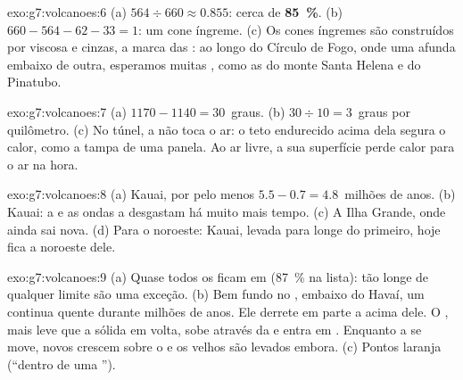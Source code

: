 \begin{solution}{exo:g7:volcanoes:6}
(a) $564 \div 660 \approx 0.855$: cerca de \textbf{85~\%}. (b)
$660 - 564 - 62 - 33 = 1$: um cone íngreme. (c) Os cones íngremes são
construídos por  viscosa e cinzas, a marca das : ao
longo do Círculo de Fogo, onde uma  afunda embaixo de outra,
esperamos muitas , como as do monte Santa Helena e do
Pinatubo.
\end{solution}

\begin{solution}{exo:g7:volcanoes:7}
(a) $1170 - 1140 = 30$~graus. (b) $30 \div 10 = 3$~graus por quilômetro.
(c) No túnel, a  não toca o ar: o teto endurecido acima dela segura o
calor, como a tampa de uma panela. Ao ar livre, a sua superfície perde
calor para o ar na hora.
\end{solution}

\begin{solution}{exo:g7:volcanoes:8}
(a) Kauai, por pelo menos $5.5 - 0.7 = 4.8$~milhões de anos. (b) Kauai: a
 e as ondas a desgastam há muito mais tempo. (c) A Ilha Grande, onde
ainda sai  nova. (d) Para o noroeste: Kauai, levada para longe do
 primeiro, hoje fica a noroeste dele.
\end{solution}

\begin{solution}{exo:g7:volcanoes:9}
(a) Quase todos os  ficam em  (87~\% na lista):
 tão longe de qualquer limite são uma exceção. (b) Bem fundo no
, embaixo do Havaí, um  continua quente durante milhões
de anos. Ele derrete em parte a  acima dele. O , mais leve que a
 sólida em volta, sobe através da  e entra em . Enquanto
a  se move, novos  crescem sobre o  e os velhos
são levados embora. (c) Pontos laranja (``dentro de uma '').
\end{solution}

